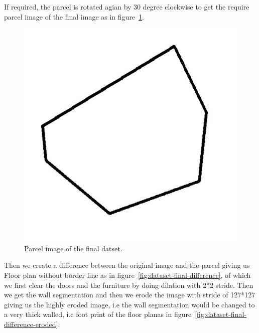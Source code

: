             \break
            If required, the parcel is rotated agian by 30 degree clockwise to get the require parcel image of the final image as in figure~\ref{fig:dataset-final-parcel}.\\
            \begin{figure}[h]
                \centering
                \begin{minipage}{.5\textwidth}
                    \centering
                    \includegraphics[width=.8\linewidth,frame]{img/experiment/dataset/5parcel.jpg}
                    \caption{Parcel image of the final datset.}
                    \label{fig:dataset-final-parcel}
                \end{minipage}%
            \end{figure}  
            Then we create a difference between the original image and the parcel giving us Floor plan without border line as in figure~\ref{fig:dataset-final-difference}, of which we first clear the doors and the furniture by doing dilation with 2*2 stride. Then we get the wall segmentation and then we erode the image with stride of 127*127 giving us the highly eroded image, i.e the wall segmentation would be changed to a very thick walled, i.e foot print of the floor planas in figure~\ref{fig:dataset-final-difference-eroded}.\\
